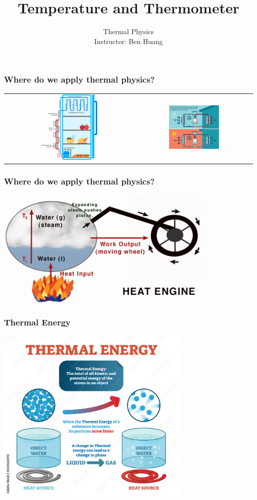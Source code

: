 \documentclass[10pt]{beamer}
\author[B.H.]{{\Large Thermal Physics}\\\vspace{6pt}Instructor: Ben Huang}
\date{}
\title[Temperature and Thermometer]{Temperature and Thermometer}
\begin{document}
\frame{\titlepage}
\begin{frame}
\frametitle{Where do we apply thermal physics?}
\begin{tabular}{cc}
\includegraphics[width=0.45\textwidth]{Fridge.jpg}\pause&
\includegraphics[width=0.45\textwidth]{heat-pump.png}
\end{tabular}
\end{frame}
\begin{frame}
\frametitle{Where do we apply thermal physics?}
\center
\includegraphics[width=0.8\textwidth]{RHE.png}
\end{frame}
\begin{frame}
\frametitle{Thermal Energy}
\center
\includegraphics[width=0.7\textwidth]{thermal-energy.jpg}
\end{frame}
\end{document}
